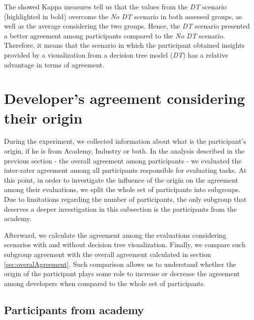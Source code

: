 The showed Kappa measures tell us that the values from the \textit{DT} scenario (highlighted in bold) overcome the \textit{No DT} scenario in both assessed groups, as well as the average considering the two groups. Hence, the \textit{DT} scenario presented a better agreement among participants compared to the \textit{No DT} scenario. Therefore, it means that the scenario in which the participant obtained insights provided by a visualization from a decision tree model (\textit{DT}) has a relative advantage in terms of agreement. %

\section{Developer's agreement considering their origin} \label{sec:originAgreement}

During the experiment, we collected information about what is the participant's origin,
if he is from Academy, Industry or both. In the analysis described in the previous section - the overall agreement among participants - we evaluated the inter-rater agreement among all participants responsible for evaluating tasks. At this point, in order to investigate the influence of the origin on the agreement among their evaluations, we split the whole set of participants into subgroups. Due to limitations regarding the number of participants, the only subgroup that deserves a deeper investigation in this subsection is the participants from the academy.

Afterward, we calculate the agreement among the evaluations considering scenarios with and without decision tree visualization. Finally, we compare such subgroup agreement with the overall agreement calculated in section \ref{sec:overalAgreement}. Such comparison allows us to understand whether the origin of the participant plays some role to increase or decrease the agreement among developers when compared to the whole set of participants. 

\subsection{Participants from academy} \label{sec:participantsAcademyAgreement}

